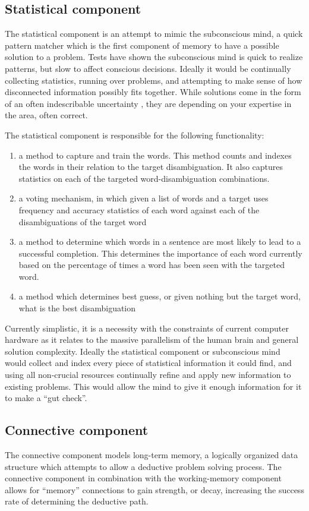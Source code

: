 \subsection{Statistical component}
The statistical component is an attempt to mimic the subconscious mind, a quick pattern matcher which is the first component of memory to have a possible solution to a problem.  Tests have shown \cite{BLINK} the subconscious mind is quick to realize patterns, but slow to affect conscious decisions. Ideally it would be continually collecting statistics, running over problems, and attempting to make sense of how disconnected information possibly fits together.  While solutions come in the form of an often indescribable uncertainty \cite{BLINK}, they are depending on your expertise in the area, often correct.

The statistical component is responsible for the following functionality:

\begin{enumerate}
	\item a method to capture and train the words.  This method counts and indexes the words in their relation to the target disambiguation. It also captures statistics on each of the targeted word-disambiguation combinations.
	\item a voting mechanism, in which given a list of words and a target uses frequency and accuracy statistics of each word against each of the disambiguations of the target word
	\item a method to determine which words in a sentence are most likely to lead to a successful completion.  This determines the importance of each word currently based on the percentage of times a word has been seen with the targeted word.
	\item a method which determines best guess, or given nothing but the target word, what is the best disambiguation
\end{enumerate}

Currently simplistic, it is a necessity with the constraints of current computer hardware as it relates to the massive parallelism of the human brain and general solution complexity.  Ideally the statistical component or subconscious mind would collect and index every piece of statistical information it could find, and using all non-crucial resources continually refine and apply new information to existing problems.  This would allow the mind to give it enough information for it to make a ``gut check''.

\subsection{Connective component}
The connective component models long-term memory, a logically organized data structure which attempts to allow a deductive problem solving process.  The connective component in combination with the working-memory component allows for ``memory'' connections to gain strength, or decay, increasing the success rate of determining the deductive path.  

